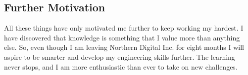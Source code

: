 \documentclass[14pt, a4paper]{awesome-cv}
\begin{document}
\begin{cvletter}
\section*{Further Motivation}
All these things have only motivated me further to keep working my hardest.  I have discovered that knowledge is something that I value more than anything else.  So, even though I am leaving Northern Digital Inc. for eight months I will aspire to be smarter and develop my engineering skills further.  The learning never stops, and I am more enthusiastic than ever to take on new challenges.

\end{cvletter}

\end{document}
